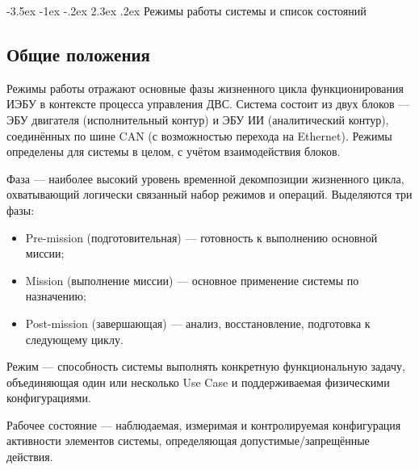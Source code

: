 \documentclass[14pt, a4paper]{extarticle}
\makeatletter
\renewcommand\section{\clearpage\@startsection{section}{1}{1.25cm}%
	{-3.5ex \@plus -1ex \@minus -.2ex}%
	{2.3ex \@plus.2ex}%
	{%
		\bfseries
		\fontsize{16}{1.5}\selectfont
}}
\makeatother
\begin{document}
			\section{Режимы работы системы и список состояний}
				\subsection{Общие положения}
				
					Режимы работы отражают основные фазы жизненного цикла функционирования ИЭБУ в контексте процесса управления ДВС. Система состоит из двух блоков — ЭБУ двигателя (исполнительный контур) и ЭБУ ИИ (аналитический контур), соединённых по шине CAN (с возможностью перехода на Ethernet). Режимы определены для системы в целом, с учётом взаимодействия блоков.
					
					Фаза — наиболее высокий уровень временной декомпозиции жизненного цикла, охватывающий логически связанный набор режимов и операций. Выделяются три фазы:
					\begin{itemize}
						\item Pre-mission (подготовительная) --- готовность к выполнению основной миссии;
						\item Mission (выполнение миссии) --- основное применение системы по назначению;
						\item Post-mission (завершающая) — анализ, восстановление, подготовка к следующему циклу.
					\end{itemize}
					
					Режим — способность системы выполнять конкретную функциональную задачу, объединяющая один или несколько Use Case и поддерживаемая физическими конфигурациями.
					
					Рабочее состояние — наблюдаемая, измеримая и контролируемая конфигурация активности элементов системы, определяющая допустимые/запрещённые действия.
				
\end{document}

